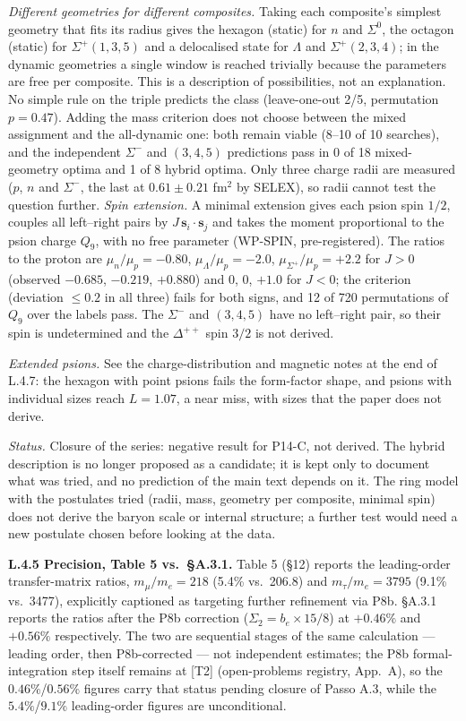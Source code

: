 \documentclass[11pt,letterpaper]{article}
\begin{document}
\noindent \emph{Different geometries for different composites.} Taking each composite's simplest geometry that fits its radius gives the hexagon (static) for $n$ and $\Sigma^0$, the octagon (static) for $\Sigma^+(1,3,5)$ and a delocalised state for $\Lambda$ and $\Sigma^+(2,3,4)$; in the dynamic geometries a single window is reached trivially because the parameters are free per composite. This is a description of possibilities, not an explanation. No simple rule on the triple predicts the class (leave-one-out 2/5, permutation $p=0.47$). Adding the mass criterion does not choose between the mixed assignment and the all-dynamic one: both remain viable (8--10 of 10 searches), and the independent $\Sigma^-$ and $(3,4,5)$ predictions pass in 0 of 18 mixed-geometry optima and 1 of 8 hybrid optima. Only three charge radii are measured ($p$, $n$ and $\Sigma^-$, the last at $0.61\pm0.21$ fm$^2$ by SELEX), so radii cannot test the question further.
\noindent \emph{Spin extension.} A minimal extension gives each psion spin $1/2$, couples all left--right pairs by $J\,\mathbf{s}_i\!\cdot\!\mathbf{s}_j$ and takes the moment proportional to the psion charge $Q_9$, with no free parameter (WP-SPIN, pre-registered). The ratios to the proton are $\mu_n/\mu_p=-0.80$, $\mu_\Lambda/\mu_p=-2.0$, $\mu_{\Sigma^+}/\mu_p=+2.2$ for $J>0$ (observed $-0.685$, $-0.219$, $+0.880$) and $0$, $0$, $+1.0$ for $J<0$; the criterion (deviation $\le0.2$ in all three) fails for both signs, and 12 of 720 permutations of $Q_9$ over the labels pass. The $\Sigma^-$ and $(3,4,5)$ have no left--right pair, so their spin is undetermined and the $\Delta^{++}$ spin $3/2$ is not derived.

\noindent \emph{Extended psions.} See the charge-distribution and magnetic notes at the end of L.4.7: the hexagon with point psions fails the form-factor shape, and psions with individual sizes reach $L=1.07$, a near miss, with sizes that the paper does not derive.

\noindent \emph{Status.} Closure of the series: negative result for P14-C, not derived. The hybrid description is no longer proposed as a candidate; it is kept only to document what was tried, and no prediction of the main text depends on it. The ring model with the postulates tried (radii, mass, geometry per composite, minimal spin) does not derive the baryon scale or internal structure; a further test would need a new postulate chosen before looking at the data.


\noindent \textbf{L.4.5 Precision, Table 5 vs.\ \S A.3.1.} Table 5 (\S12) reports the leading-order transfer-matrix ratios, $m_\mu/m_e=218$ (5.4\% vs.\ 206.8) and $m_\tau/m_e=3795$ (9.1\% vs.\ 3477), explicitly captioned as targeting further refinement via P8b. \S A.3.1 reports the ratios after the P8b correction ($\Sigma_2=b_e\times 15/8$) at $+0.46\%$ and $+0.56\%$ respectively. The two are sequential stages of the same calculation --- leading order, then P8b-corrected --- not independent estimates; the P8b formal-integration step itself remains at [T2] (open-problems registry, App.~A), so the $0.46\%$/$0.56\%$ figures carry that status pending closure of Passo A.3, while the $5.4\%$/$9.1\%$ leading-order figures are unconditional.
\end{document}
